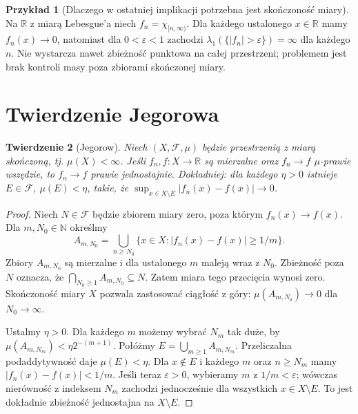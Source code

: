 \documentclass[11pt,a4paper,oneside]{book}
\numberwithin{equation}{chapter}
\theoremstyle{plain}
\newtheorem{twierdzenie}{Twierdzenie}[chapter]
\theoremstyle{definition}
\newtheorem{przyklad}[twierdzenie]{Przykład}
\theoremstyle{remark}
\begin{document}
\begin{przyklad}[Dlaczego w ostatniej implikacji potrzebna jest skończoność miary]
\label{ex:ae-not-measure-infinite-9}
Na $\mathbb R$ z miarą Lebesgue'a niech
$f_n=\chi_{[n,\infty)}$. Dla każdego ustalonego
$x\in\mathbb R$ mamy $f_n(x)\to0$, natomiast
dla $0<\varepsilon<1$ zachodzi
$\lambda_1(\{|f_n|>\varepsilon\})=\infty$ dla
każdego $n$. Nie wystarcza nawet zbieżność punktowa
na całej przestrzeni; problemem jest brak kontroli
masy poza zbiorami skończonej miary.
\end{przyklad}

\section{Twierdzenie Jegorowa}

\begin{twierdzenie}[Jegorow]
\label{thm:egorov-9}
Niech $(X,\mathcal F,\mu)$ będzie przestrzenią z miarą
skończoną, tj. $\mu(X)<\infty$. Jeśli
$f_n,f:X\to\mathbb R$ są mierzalne oraz
$f_n\to f$ $\mu$-prawie wszędzie, to
$f_n\to f$ prawie jednostajnie. Dokładniej: dla każdego
$\eta>0$ istnieje $E\in\mathcal F$, $\mu(E)<\eta$,
takie, że
$\sup_{x\in X\setminus E}|f_n(x)-f(x)|\to0$.
\end{twierdzenie}
\begin{proof}
Niech $N\in\mathcal F$ będzie zbiorem miary zero,
poza którym $f_n(x)\to f(x)$. Dla $m,N_0\in\mathbb N$
określmy
\[
A_{m,N_0}=\bigcup_{n\ge N_0}
\{x\in X:|f_n(x)-f(x)|\ge1/m\}.
\]
Zbiory $A_{m,N_0}$ są mierzalne i dla ustalonego $m$
maleją wraz z $N_0$. Zbieżność poza $N$ oznacza,
że $\bigcap_{N_0\ge1}A_{m,N_0}\subseteq N$.
Zatem miara tego przecięcia wynosi zero. Skończoność
miary $X$ pozwala zastosować ciągłość z góry:
$\mu(A_{m,N_0})\to0$ dla $N_0\to\infty$.

Ustalmy $\eta>0$. Dla każdego $m$ możemy wybrać
$N_m$ tak duże, by
$\mu(A_{m,N_m})<\eta 2^{-(m+1)}$.
Połóżmy $E=\bigcup_{m\ge1}A_{m,N_m}$.
Przeliczalna podaddytywność daje
$\mu(E)<\eta$.
Dla $x\notin E$ i każdego $m$ oraz $n\ge N_m$
mamy $|f_n(x)-f(x)|<1/m$. Jeśli teraz
$\varepsilon>0$, wybieramy $m$ z $1/m<\varepsilon$;
wówczas nierówność z indeksem $N_m$ zachodzi
jednocześnie dla wszystkich $x\in X\setminus E$.
To jest dokładnie zbieżność jednostajna na
$X\setminus E$.
\end{proof}
\end{document}

